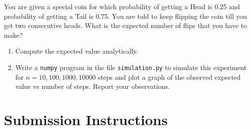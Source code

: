 \documentclass{article}
\begin{document}
You are given a special coin for which probability of getting a Head is 0.25 and probability of getting a Tail is 0.75. You are told to keep flipping the coin till you get two consecutive heads. What is the expected number of flips that you have to make? 
\begin{enumerate}[leftmargin=*, label=(\alph*)]
    \item Compute the expected value  analytically.
    \item Write a \texttt{numpy} program in the file \texttt{simulation.py} to simulate this experiment for $n=10,100,1000,10000$ steps and plot a graph of the observed expected value vs number of steps. Report your observations.
\end{enumerate}

\section*{Submission Instructions}
\end{document}
